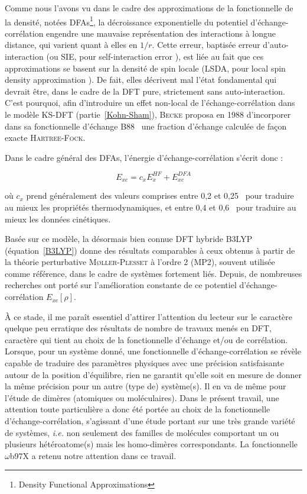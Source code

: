 	Comme nous l'avons vu dans le cadre des approximations de la fonctionnelle de la densité, notées DFAs\footnote{\og Density Functional Approximations \fg{} }, la décroissance exponentielle du potentiel d'échange-corrélation engendre une mauvaise représentation des interactions à longue distance, qui varient quant à elles en $1/r$. Cette erreur, baptisée erreur d'auto-interaction (ou SIE, pour \og self-interaction error \fg{}), est liée au fait que ces approximations se basent sur la densité de spin locale (LSDA, pour \og local spin density approximation \fg{}). De fait, elles décrivent mal l'état fondamental qui devrait être, dans le cadre de la DFT pure, strictement sans auto-interaction.     
	C'est pourquoi, afin d'introduire un effet non-local de l'échange-corrélation dans le modèle KS-DFT (partie~\ref{Kohn-Sham}), \textsc{Becke} proposa en 1988 d'incorporer dans sa fonctionnelle d'échange B88~\cite{becke1988density} une fraction d'échange calculée de façon exacte \textsc{Hartree-Fock}. 
	
	Dans le cadre général des DFAs, l'énergie d'échange-corrélation s'écrit donc :
	
	\begin{equation}
	E_{xc} = c_{x}E_{x}^{HF} + E_{xc}^{DFA}
	\label{xcB88}
	\end{equation}
	
	\noindent où $c_{x}$ prend généralement des valeurs comprises entre 0,2 et 0,25~\cite{becke1993density} pour traduire au mieux les propriétés thermodynamiques, et entre 0,4 et 0,6~\cite{boese2004development} pour traduire au mieux les données cinétiques.
	
	Basée sur ce modèle, la désormais bien connue DFT hybride B3LYP \cite{becke1993density} (équation~\ref{B3LYP}) donne des résultats comparables à ceux obtenus à partir de la théorie perturbative \textsc{M\o ller-Plesset} à l'ordre 2 \cite{moller1934note} (MP2), souvent utilisée comme référence, dans le cadre de systèmes fortement liés. Depuis, de nombreuses recherches ont porté sur l'amélioration constante de ce potentiel d'échange-corrélation $E_{xc}[\rho]$.
	
	À ce stade, il me paraît essentiel d'attirer l’attention du lecteur sur le caractère quelque peu \og erratique \fg{} des résultats de nombre de travaux menés en DFT, caractère qui tient au choix de la fonctionnelle d'échange et/ou de corrélation. 
	 Lorsque, pour un système donné, une fonctionnelle d’échange-corrélation se révèle capable de traduire des paramètres physiques avec une précision satisfaisante autour de la position d’équilibre, rien ne garantit qu’elle soit en mesure de donner la même précision pour un autre (type de) système(s). Il en va de même pour l’étude de dimères (atomiques ou moléculaires). Dans le présent travail, une attention toute particulière a donc été portée au choix de la fonctionnelle d’échange-corrélation, s'agissant d'une étude portant sur une très grande variété de systèmes, \textit{i.e.} non seulement des familles de molécules comportant un ou plusieurs hétéroatome(s) mais les homo-dimères correspondants. La fonctionnelle $\omega$b97X a retenu notre attention dans ce travail.
	
